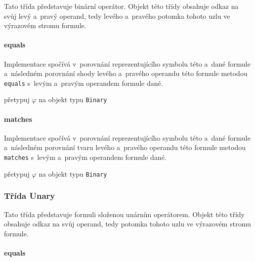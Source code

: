 \documentclass[thesis=B,czech,hidelinks]{thesis}[2012/06/26]
\begin{document}
Tato třída představuje binární operátor. Objekt této třídy obsahuje odkaz na svůj levý a~pravý operand, tedy levého a~pravého potomka tohoto uzlu ve výrazovém stromu formule.

\paragraph{equals}

Implementace spočívá v~porovnání reprezentujícího symbolu této a~dané formule a~následném porovnání shody levého a~pravého operandu této formule metodou \texttt{equals} s~levým a~pravým operandem formule dané.

\begin{algorithm}
{
	přetypuj $\varphi$ na objekt typu \texttt{Binary}\;
	\;
}
\end{algorithm}

\paragraph{matches}

Implementace spočívá v~porovnání reprezentujícího symbolu této a~dané formule a~následném porovnání tvaru levého a~pravého operandu této formule metodou \texttt{matches} s~levým a~pravým operandem formule dané.

\begin{algorithm}
{
	přetypuj $\varphi$ na objekt typu \texttt{Binary}\;
	\;
}
\end{algorithm}

\subsubsection{Třída Unary}

Tato třída představuje formuli složenou unárním operátorem. Objekt této třídy obsahuje odkaz na svůj operand, tedy potomka tohoto uzlu ve výrazovém stromu formule.

\paragraph{equals}
\end{document}
